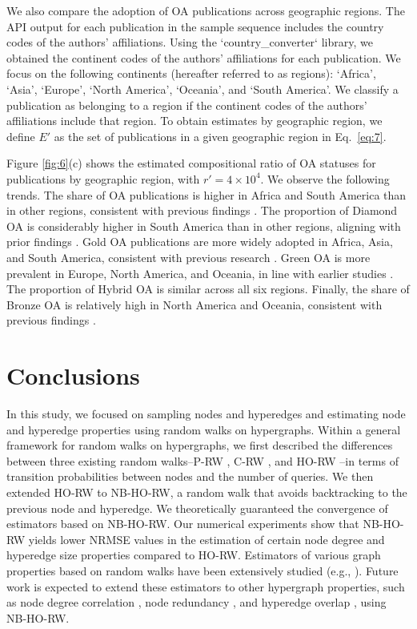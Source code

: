 We also compare the adoption of OA publications across geographic regions.  
The API output for each publication in the sample sequence includes the country codes of the authors' affiliations.  
Using the `country\_converter` library, we obtained the continent codes of the authors' affiliations for each publication.  
We focus on the following continents (hereafter referred to as regions): `Africa', `Asia', `Europe', `North America', `Oceania', and `South America'.  
We classify a publication as belonging to a region if the continent codes of the authors' affiliations include that region.  
To obtain estimates by geographic region, we define $E'$ as the set of publications in a given geographic region in Eq.~\eqref{eq:7}.

Figure \ref{fig:6}(c) shows the estimated compositional ratio of OA statuses for publications by geographic region, with $r' = 4 \times 10^4$.  
We observe the following trends.  
The share of OA publications is higher in Africa and South America than in other regions, consistent with previous findings \cite{demeter2021, basson2022, simard2022}.  
The proportion of Diamond OA is considerably higher in South America than in other regions, aligning with prior findings \cite{bosman2021}.  
Gold OA publications are more widely adopted in Africa, Asia, and South America, consistent with previous research \cite{simard2022, basson2022}.  
Green OA is more prevalent in Europe, North America, and Oceania, in line with earlier studies \cite{basson2022, simard2022}.  
The proportion of Hybrid OA is similar across all six regions.  
Finally, the share of Bronze OA is relatively high in North America and Oceania, consistent with previous findings \cite{simard2022, basson2022}.

\section{Conclusions} \label{section:4}

In this study, we focused on sampling nodes and hyperedges and estimating node and hyperedge properties using random walks on hypergraphs. 
Within a general framework for random walks on hypergraphs, we first described the differences between three existing random walks--P-RW \cite{zhou2006, battiston2020, zhang2023, traversa2024}, C-RW \cite{carletti2020}, and HO-RW \cite{banerjee2021, luo2024, traversa2024}--in terms of transition probabilities between nodes and the number of queries. 
We then extended HO-RW to NB-HO-RW, a random walk that avoids backtracking to the previous node and hyperedge. 
We theoretically guaranteed the convergence of estimators based on NB-HO-RW. 
Our numerical experiments show that NB-HO-RW yields lower NRMSE values in the estimation of certain node degree and hyperedge size properties compared to HO-RW. 
Estimators of various graph properties based on random walks have been extensively studied (e.g., \cite{gjoka2011, ribeiro2010, hardiman2013, wang2014, chen2016}). 
Future work is expected to extend these estimators to other hypergraph properties, such as node degree correlation \cite{latapy2008, nakajima2022}, node redundancy \cite{latapy2008, nakajima2022}, and hyperedge overlap \cite{lee2021, malizia2025}, using NB-HO-RW.

